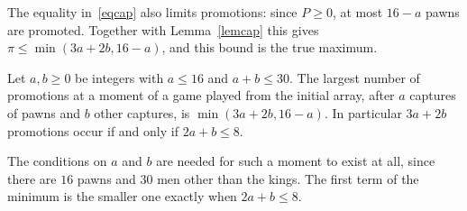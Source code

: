 \documentclass[12pt,reqno]{article}
\begin{document}
The equality in~\eqref{eqcap} also limits promotions: since $P\geq 0$, at most $16-a$ pawns are
promoted. Together with Lemma~\ref{lemcap} this gives $\pi\leq\min(3a+2b,16-a)$, and this bound is
the true maximum.

\begin{theorem}\label{thmsharp}
Let $a,b\geq 0$ be integers with $a\leq 16$ and $a+b\leq 30$. The largest number of promotions
at a moment of a game played from the initial array, after $a$ captures of pawns and $b$ other
captures, is $\min(3a+2b,16-a)$. In particular $3a+2b$ promotions occur if and only if
$2a+b\leq 8$.
\end{theorem}

The conditions on $a$ and $b$ are needed for such a moment to exist at all, since there are
$16$ pawns and $30$ men other than the kings. The first term of the minimum is the smaller one
exactly when $2a+b\leq 8$.
\end{document}
